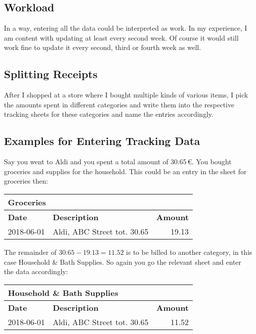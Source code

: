 \subsection{Workload}
\label{subsec:tracking-workload}

In a way, entering all the data could be interpreted as work.
In my experience, I am content with updating \tfn at least every second week.
Of course it would still work fine to update it every second, third or fourth week as well.


\subsection{Splitting Receipts}
\label{subsec:splitting-receipts}

After I shopped at a store where I bought multiple kinds of various items, I pick the amounts spent in different categories and write them into the respective tracking sheets for these categories and name the entries accordingly.

\subsection{Examples for Entering Tracking Data}
\label{subsec:examples-for-entering-tracking-data}

Say you went to Aldi and you spent a total amount of 30.65\,€.
You bought groceries and supplies for the household.
This could be an entry in the sheet for groceries then:
\begin{center}\sffamily
	\begin{tabular}{|l|l|r|}
		\multicolumn{3}{l}{Groceries}\\
		\hline
		\textbf{Date} & \textbf{Description} & \textbf{Amount}\rmfamily\\
		\hline
		2018-06-01 & Aldi, ABC Street tot. 30.65 & 19.13\\
		\hline
	\end{tabular}
\end{center}

The remainder of \( 30.65 - 19.13 = 11.52\) is to be billed to another category, in this case Household \& Bath Supplies.
So again you go the relevant sheet and enter the data accordingly:
\begin{center}\sffamily
	\begin{tabular}{|l|l|r|}
		\multicolumn{3}{l}{Household \& Bath Supplies}\\			
		\hline
		\textbf{Date} & \textbf{Description} & \textbf{Amount}\\
		\hline
		2018-06-01 & Aldi, ABC Street tot. 30.65 & 11.52\\
		\hline
	\end{tabular}
\end{center}

